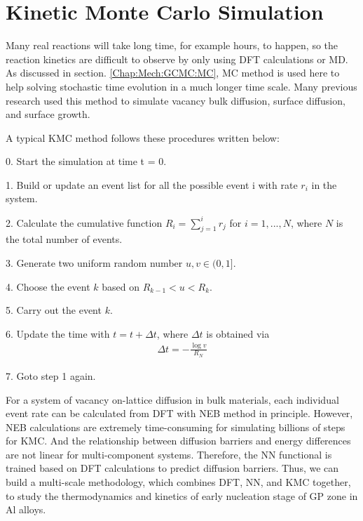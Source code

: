 \section{Kinetic Monte Carlo Simulation}
\label{Chap:Mech:KMC}

Many real reactions will take long time, for example hours, to happen, so the reaction kinetics are difficult to observe by only using \ac{DFT} calculations or \ac{MD}. As discussed in section. \ref{Chap:Mech:GCMC:MC}, \ac{MC} method is used here to help solving stochastic time evolution in a much longer time scale. Many previous research used this method to simulate vacancy bulk diffusion, surface diffusion, and surface growth. \cite{frenkel2001understanding, leach2001molecular}

A typical \ac{KMC} method follows these procedures written below:

0. Start the simulation at time t = 0.

1. Build or update an event list for all the possible event i with rate $r_i$ in the system.

2. Calculate the cumulative function $R_i = \sum_{j=1}^i r_j$ for $i = 1,...,N$, where $N$ is the total number of events.

3. Generate two uniform random number $u, v \in (0, 1]$.

4. Choose the event $k$ based on $R_{k-1} < u < R_k$.

5. Carry out the event $k$.

6. Update the time with $t = t + \Delta t$, where $\Delta t$ is obtained via
\begin{align}
    \Delta t = - \frac{\log{v}}{R_N}
    \label{Chap:Meth:eq:KMC:1}
\end{align}

7. Goto step 1 again.

For a system of vacancy on-lattice diffusion in bulk materials, each individual event rate can be calculated from \ac{DFT} with \ac{NEB} method in principle. However, \ac{NEB} calculations are extremely time-consuming for simulating billions of steps for \ac{KMC}. And the relationship between diffusion barriers and energy differences are not linear for multi-component systems. Therefore, the \ac{NN} functional is trained based on \ac{DFT} calculations to predict diffusion barriers. Thus, we can build a multi-scale methodology, which combines \ac{DFT}, \ac{NN}, and \ac{KMC} together, to study the thermodynamics and kinetics of early nucleation stage of GP zone in Al alloys.